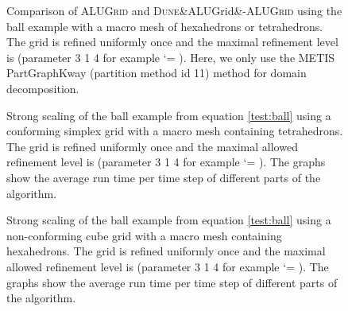 \documentclass[10pt,notitlepage,a4paper]{article}
\makeatletter
\newcommand{\dune}[1][]{\textsc{Dune}\ifx&#1&\else\textsc{-{#1}}\fi\xspace}
\newcommand{\alugrid}{\textsc{ALUGrid}\xspace}
\newcommand{\code}[1]{ \lstinline[basicstyle=\small\sffamily]{#1} }
\renewcommand\lstinline[1][]{\leavevmode\bgroup \def\lst@boxpos{b}\lsthk@PreSet\lstset{flexiblecolumns,#1}\lsthk@TextStyle
          \ifnum\iffalse{\fi`}=\z@\fi
          \@ifnextchar\bgroup{\ifnum`{=\z@}\fi \afterassignment\lst@InlineG \let\@let@token}{\ifnum`{=\z@}\fi\lstinline@}}
\makeatother
\begin{document}
\begin{figure}[!ht]
\caption{Comparison of \alugrid  and \dune[ALUGrid] using the
         ball example with a macro mesh of  hexahedrons or  tetrahedrons.
         The grid is refined uniformly once and the maximal refinement level is
          (parameter 3 1 4  for example \code{main_ball}).
         Here, we only use the METIS PartGraphKway (partition method id 11)
         method for domain decomposition.}
\label{fig:scaling314_comparison}
\end{figure}
\begin{figure}[!ht]
\caption{Strong scaling of the 
          ball example from equation \eqref{test:ball} using a conforming simplex grid with 
         a macro mesh containing  tetrahedrons.
         The grid is refined uniformly once and the maximal allowed refinement level is
          (parameter 3 1 4  for example \code{main_ball}).
         The graphs show the average run time per time step of different parts of the
         algorithm.}
\label{fig:scaling314_conf}         
\end{figure}
\begin{figure}[!ht]
  \caption{Strong scaling of the ball example from equation \eqref{test:ball} using a non-conforming cube grid with
         a macro mesh containing  hexahedrons.
         The grid is refined uniformly once and the maximal allowed refinement level is
          (parameter 3 1 4  for example \code{main_ball}).
         The graphs show the average run time per time step of different parts of the
         algorithm.}
\label{fig:scaling314_cube}         
\end{figure}
\end{document}
